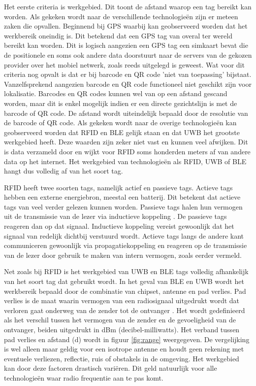 Het eerste criteria is werkgebied. Dit toont de afstand waarop een tag bereikt kan worden. Als gekeken wordt naar de verschillende technologieën zijn er meteen zaken die opvallen. Beginnend bij GPS waarbij kan geobserveerd worden dat het werkbereik oneindig is. Dit betekend dat een GPS tag van overal ter wereld bereikt kan worden. Dit is logisch aangezien een GPS tag een simkaart bevat die de positionele en soms ook andere data doorstuurt naar de servers van de gekozen provider over het mobiel netwerk, zoals reeds uitgelegd is geweest. Wat voor dit criteria nog opvalt is dat er bij barcode en QR code 'niet van toepassing' bijstaat. Vanzelfsprekend aangezien barcode en QR code functioneel niet geschikt zijn voor lokalisatie. Barcodes en QR codes kunnen wel van op een afstand gescand worden, maar dit is enkel mogelijk indien er een directe gezichtslijn is met de barcode of QR code. De afstand wordt uiteindelijk bepaald door de resolutie van de barcode of QR code. Als gekeken wordt naar de overige technologieën kan geobserveerd worden dat RFID en BLE gelijk staan en dat UWB het grootste werkgebied heeft. Deze waarden zijn zeker niet vast en kunnen veel afwijken. Dit is data verzameld door \textcite{Roberts2006} en wijkt voor RFID soms honderden meters af van andere data op het internet. Het werkgebied van technologieën als RFID, UWB of BLE hangt dus volledig af van het soort tag. 

RFID heeft twee soorten tags, namelijk actief en passieve tags. Actieve tags hebben een externe energiebron, meestal een batterij. Dit betekent dat actieve tags van veel verder gelezen kunnen worden. Passieve tags halen hun vermogen uit de transmissie van de lezer via inductieve koppeling \autocite{Roberts2006}. De passieve tags reageren dan op dat signaal. Inductieve koppeling vereist gewoonlijk dat het signaal van redelijk dichtbij verstuurd wordt. Actieve tags langs de andere kant communiceren gewoonlijk via propagatiekoppeling en reageren op de transmissie van de lezer door gebruik te maken van intern vermogen, zoals eerder vermeld.

Net zoals bij RFID is het werkgebied van UWB en BLE tags volledig afhankelijk van het soort tag dat gebruikt wordt. In het geval van BLE en UWB wordt het werkbereik bepaald door de combinatie van chipset, antenne en pad verlies. Pad verlies is de maat waarin vermogen van een radiosignaal uitgedrukt wordt dat verloren gaat onderweg van de zender tot de ontvanger \autocite{Tosi2017}. Het wordt gedefinieerd als het verschil tussen het vermogen van de zender en de gevoeligheid van de ontvanger, beiden uitgedrukt in dBm (decibel-milliwatts). Het verband tussen pad verlies en afstand (d) wordt in figuur \ref{fig:range} weergegeven. De vergelijking is wel alleen maar geldig voor een isotrope antenne en houdt geen rekening met eventuele verliezen, reflectie, ruis of obstakels in de omgeving. Het werkgebied kan door deze factoren drastisch variëren. Dit geld natuurlijk voor alle technologieën waar radio frequentie aan te pas komt.\\ 


